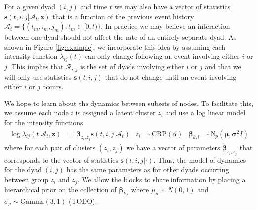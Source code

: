 \documentclass{article}
\begin{document}


%   

For a given dyad $(i,j)$ and time $t$ we may also have a vector of statistics $\mathbf{s}(t,i,j|\mathcal{A}_t,\mathbf{z})$ that is a function of the previous event history  $\mathcal{A}_t = \{(t_m,i_m,j_m): t_m \in [0,t)\}$.   In practice we may believe an interaction between one dyad should not affect the rate of an entirely separate dyad.  As shown in Figure \ref{fig:example}, we incorporate this idea by assuming each intensity function $\lambda_{ij}(t)$ can only change following an event involving either $i$ or $j$.  This implies that  $\mathcal{R}_{i,j}$ is the set of dyads involving either $i$ or $j$ and that we will only use  statistics $\mathbf{s}(t,i,j)$ that do not change until an event involving either $i$ or $j$ occurs.  

We hope to learn about the dynamics between subsets of nodes.   To facilitate this, we assume each node $i$ is assigned a latent cluster $z_i$ and use a log linear model for the intensity functions
\begin{align*}
\log \lambda_{ij}(t | \mathcal{A}_t,\mathbf{z}) &= \boldsymbol{\beta}_{z_i,z_j} \mathbf{s}(t,i,j|\mathcal{A}_t) &
z_i &\sim \mbox{CRP}(\alpha) &
\boldsymbol{\beta}_{k,l} &\sim \mbox{N}_p(\boldsymbol{\mu},\boldsymbol{\sigma}^2I)
\end{align*}
where for each pair of clusters $(z_i,z_j)$ we have a vector of parameters $\boldsymbol{\beta}_{z_i,z_j}$ that corresponds to the vector of statistics $\mathbf{s}(t,i,j|\cdot)$.   Thus, the model of dynamics for the dyad $(i,j)$ has the same parameters as for other dyads occurring between group $z_i$ and $z_j$.  We allow  the blocks to share information by placing a hierarchical prior on the collection of $\boldsymbol{\beta}_{k.l}$ where $\mu_p \sim N(0,1)$ and $\sigma_p \sim \mbox{Gamma}(3,1)$ (TODO). 
\end{document}
